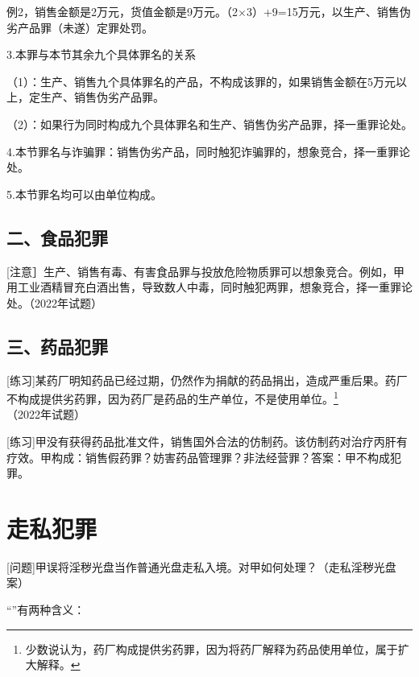 例2，销售金额是2万元，货值金额是9万元。（2\ensuremath{\times}3）+9=15万元，以生产、销售伪劣产品罪（未遂）定罪处罚。

3.本罪与本节其余九个具体罪名的关系

（1）：生产、销售九个具体罪名的产品，不构成该罪的，如果销售金额在5万元以上，定生产、销售伪劣产品罪。

（2）：如果行为同时构成九个具体罪名和生产、销售伪劣产品罪，择一重罪论处。

4.本节罪名与诈骗罪：销售伪劣产品，同时触犯诈骗罪的，想象竞合，择一重罪论处。

5.本节罪名均可以由单位构成。

\subsection*{二、食品犯罪}


[注意］生产、销售有毒、有害食品罪与投放危险物质罪可以想象竞合。例如，甲用工业酒精冒充白酒出售，导致数人中毒，同时触犯两罪，想象竞合，择一重罪论处。（2022年试题）

\subsection*{三、药品犯罪}


[练习]某药厂明知药品已经过期，仍然作为捐献的药品捐出，造成严重后果。药厂不构成提供劣药罪，因为药厂是药品的生产单位，不是使用单位。\footnote{少数说认为，药厂构成提供劣药罪，因为将药厂解释为药品使用单位，属于扩大解释。}（2022年试题）


[练习]甲没有获得药品批准文件，销售国外合法的仿制药。该仿制药对治疗丙肝有疗效。甲构成：销售假药罪？妨害药品管理罪？非法经营罪？答案：甲不构成犯罪。

\section{走私犯罪}

[问题]甲误将淫秽光盘当作普通光盘走私入境。对甲如何处理？（走私淫秽光盘案）

“”有两种含义：

